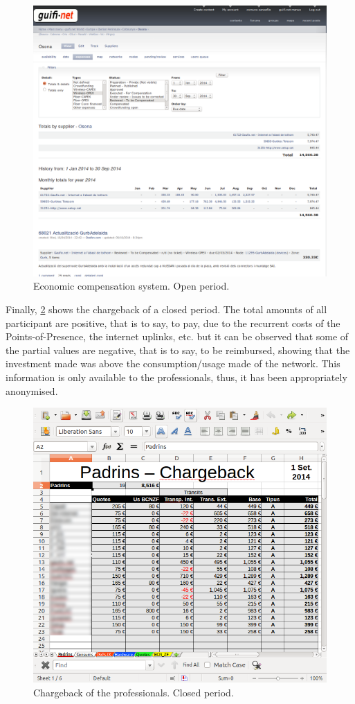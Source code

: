 \begin{figure}[H]
  \centering
  \includegraphics[width=0.95\linewidth]{sect2/figures/Compen_Osona_2_crop.png}
  \caption[Economic compensation system. Open period.]{Economic compensation system. Open period.}
  \label{fig:comp2}
\end{figure}

Finally, \figurename \ref{fig:comp3} shows the chargeback of a closed period. The total amounts of all participant are positive, that is to say, to pay, due to the recurrent costs of the Points-of-Presence, the internet uplinks, etc. but it can be observed that some of the partial values are negative, that is to say, to be reimbursed, showing that the investment made was above the consumption/usage made of the network. This information is only available to the professionals, thus, it has been appropriately anonymised.

\begin{figure}[H]
  \centering
  \includegraphics[width=0.65\linewidth]{sect2/figures/chargeback.png}
  \caption[Economic compensation system. Closed period.]{Chargeback of the professionals. Closed period.}
  \label{fig:comp3}
\end{figure}


